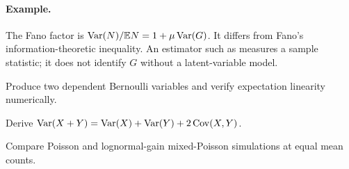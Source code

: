 \paragraph{Example.} The Fano factor is $\operatorname{Var}(N)/\mathbb E N=1+\mu\operatorname{Var}(G)$. It differs from Fano's information-theoretic inequality. An estimator such as \texttt{} measures a sample statistic; it does not identify $G$ without a latent-variable model.

\begin{exercises}
\item Produce two dependent Bernoulli variables and verify expectation linearity numerically.
\item Derive $\operatorname{Var}(X+Y)=\operatorname{Var}(X)+\operatorname{Var}(Y)+2\operatorname{Cov}(X,Y)$.
\item Compare Poisson and lognormal-gain mixed-Poisson simulations at equal mean counts.
\end{exercises}